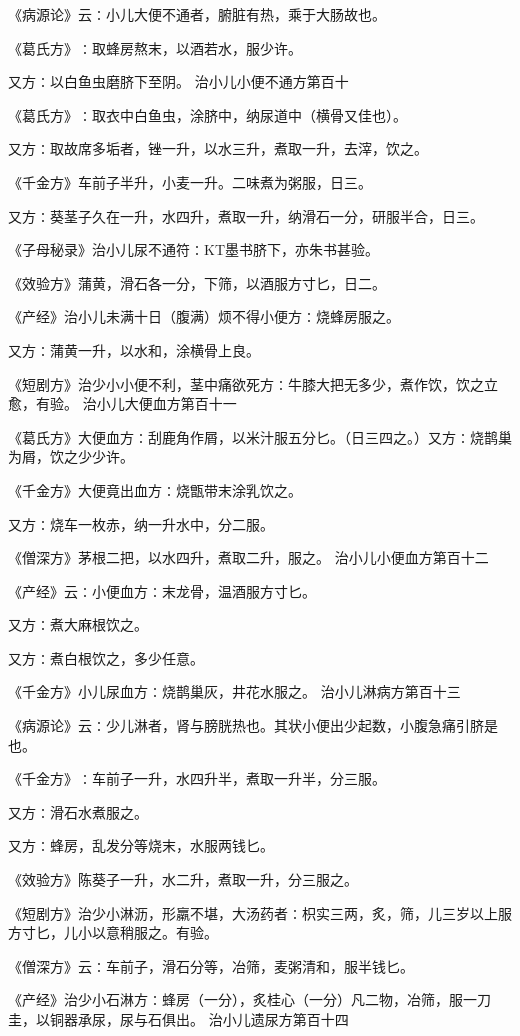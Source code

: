 \documentclass[a4paper,12pt,UTF8,twoside]{ctexbook}
\begin{document}
《病源论》云∶小儿大便不通者，腑脏有热，乘于大肠故也。

《葛氏方》∶取蜂房熬末，以酒若水，服少许。

又方∶以白鱼虫磨脐下至阴。
治小儿小便不通方第百十

《葛氏方》∶取衣中白鱼虫，涂脐中，纳尿道中（横骨又佳也）。

又方∶取故席多垢者，锉一升，以水三升，煮取一升，去滓，饮之。

《千金方》车前子半升，小麦一升。二味煮为粥服，日三。

又方∶葵茎子久在一升，水四升，煮取一升，纳滑石一分，研服半合，日三。

《子母秘录》治小儿尿不通符∶KT墨书脐下，亦朱书甚验。

《效验方》蒲黄，滑石各一分，下筛，以酒服方寸匕，日二。

《产经》治小儿未满十日（腹满）烦不得小便方∶烧蜂房服之。

又方∶蒲黄一升，以水和，涂横骨上良。

《短剧方》治少小小便不利，茎中痛欲死方∶牛膝大把无多少，煮作饮，饮之立愈，有验。
治小儿大便血方第百十一

《葛氏方》大便血方∶刮鹿角作屑，以米汁服五分匕。（日三四之。）又方∶烧鹊巢为屑，饮之少少许。

《千金方》大便竟出血方∶烧甑带末涂乳饮之。

又方∶烧车一枚赤，纳一升水中，分二服。

《僧深方》茅根二把，以水四升，煮取二升，服之。
治小儿小便血方第百十二

《产经》云∶小便血方∶末龙骨，温酒服方寸匕。

又方∶煮大麻根饮之。

又方∶煮白根饮之，多少任意。

《千金方》小儿尿血方∶烧鹊巢灰，井花水服之。
治小儿淋病方第百十三

《病源论》云∶少儿淋者，肾与膀胱热也。其状小便出少起数，小腹急痛引脐是也。

《千金方》∶车前子一升，水四升半，煮取一升半，分三服。

又方∶滑石水煮服之。

又方∶蜂房，乱发分等烧末，水服两钱匕。

《效验方》陈葵子一升，水二升，煮取一升，分三服之。

《短剧方》治少小淋沥，形羸不堪，大汤药者∶枳实三两，炙，筛，儿三岁以上服方寸匕，儿小以意稍服之。有验。

《僧深方》云∶车前子，滑石分等，冶筛，麦粥清和，服半钱匕。

《产经》治少小石淋方∶蜂房（一分），炙桂心（一分）凡二物，冶筛，服一刀圭，以铜器承尿，尿与石俱出。
治小儿遗尿方第百十四
\end{document}
